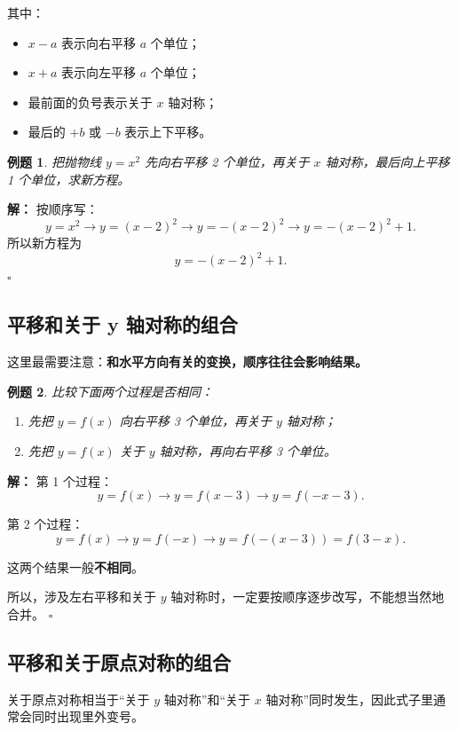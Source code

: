 \documentclass[11pt,a4paper,fontset=fandol]{ctexart}
\theoremstyle{formaltheorem}
\theoremstyle{formalexample}
\newtheorem{example}{例题}[section]
\newenvironment{solution}{\par\noindent\textbf{解：}}{\hfill$\square$\par}
\begin{document}
其中：
\begin{itemize}
  \item \(x-a\) 表示向右平移 \(a\) 个单位；
  \item \(x+a\) 表示向左平移 \(a\) 个单位；
  \item 最前面的负号表示关于 \(x\) 轴对称；
  \item 最后的 \(+b\) 或 \(-b\) 表示上下平移。
\end{itemize}

\begin{example}
把抛物线 \(y=x^2\) 先向右平移 2 个单位，再关于 \(x\) 轴对称，最后向上平移 1 个单位，求新方程。
\end{example}

\begin{solution}
按顺序写：
\[
y=x^2 \rightarrow y=(x-2)^2 \rightarrow y=-(x-2)^2 \rightarrow y=-(x-2)^2+1.
\]
所以新方程为
\[
y=-(x-2)^2+1.
\]
\end{solution}

\subsection{平移和关于 y 轴对称的组合}
这里最需要注意：\textbf{和水平方向有关的变换，顺序往往会影响结果。}

\begin{example}
比较下面两个过程是否相同：
\begin{enumerate}
  \item 先把 \(y=f(x)\) 向右平移 3 个单位，再关于 \(y\) 轴对称；
  \item 先把 \(y=f(x)\) 关于 \(y\) 轴对称，再向右平移 3 个单位。
\end{enumerate}
\end{example}

\begin{solution}
第 1 个过程：
\[
y=f(x) \rightarrow y=f(x-3) \rightarrow y=f(-x-3).
\]

第 2 个过程：
\[
y=f(x) \rightarrow y=f(-x) \rightarrow y=f(-(x-3))=f(3-x).
\]

这两个结果一般\textbf{不相同}。

所以，涉及左右平移和关于 \(y\) 轴对称时，一定要按顺序逐步改写，不能想当然地合并。
\end{solution}

\subsection{平移和关于原点对称的组合}
关于原点对称相当于“关于 \(y\) 轴对称”和“关于 \(x\) 轴对称”同时发生，因此式子里通常会同时出现里外变号。
\end{document}

